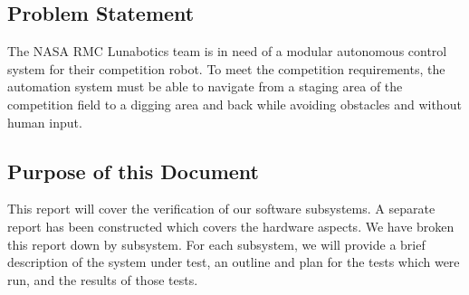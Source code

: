 \subsection{Problem Statement}\label{subsec:problem-statement}
The NASA RMC Lunabotics team is in need of a modular autonomous control system for their competition robot.
To meet the competition requirements, the automation system must be able to navigate from a staging area of the
competition field to a digging area and back while avoiding obstacles and without human input.

\subsection{Purpose of this Document}\label{subsec:purpose}
This report will cover the verification of our software subsystems.
A separate report has been constructed which covers the hardware aspects.
We have broken this report down by subsystem.
For each subsystem, we will provide a brief description of the system under test,
an outline and plan for the tests which were run,
and the results of those tests.